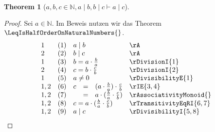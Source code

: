\documentclass{book}
\theoremstyle{plain}
\newtheorem{theorem}{Theorem}
\theoremstyle{remark}
\theoremstyle{definition}
\begin{document}
\label{awbwcInNaturalwaMidbwbMidcImpaMidc}
\begin{theorem}[\(a,b,c\in\mathbb{N}, a\mid b, b\mid c \vdash a\mid c\)]
\end{theorem}
\begin{proof}
Sei \(a\in\mathbb{N}\).
Im Beweis nutzen wir das Theorem \(\LeqIsHalfOrderOnNaturalNumbers{}\). 
    \[
	\begin{array}{llclll}
        1       &  (1)  & \multicolumn{3}{l}{a\mid b} & \rA \\
        2       &  (2)  & \multicolumn{3}{l}{b\mid c} & \rA \\
        1       &  (3)  & \multicolumn{3}{l}{b=a\cdot \frac{b}{a}} & \rDivisionI{1} \\
        2       &  (4)  & \multicolumn{3}{l}{c=b\cdot \frac{c}{b}} & \rDivisionI{2} \\
        1       &  (5)  & \multicolumn{3}{l}{a\neq 0} & \rDivisibilityE{1} \\
        1,2     &  (6)  & c&=&(a\cdot \frac{b}{a})\cdot \frac{c}{b} & \rIE{3,4} \\
        1,2     &  (7)  & &=&a\cdot (\frac{b}{a}\cdot \frac{c}{b}) & \rAssociativityMonoid{} \\
        1,2     &  (8)  & \multicolumn{3}{l}{c=a\cdot (\frac{b}{a}\cdot \frac{c}{b})} & \rTransitivityEqRI{6,7} \\
        1,2     &  (9)  & \multicolumn{3}{l}{a\mid c} & \rDivisibilityI{5,8} \\
        \end{array}
    \]
\end{proof}
\end{document}
